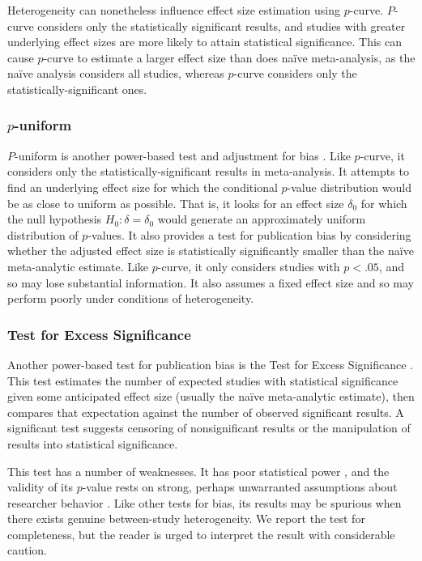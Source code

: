\documentclass[man]{apa6}
\begin{document}
Heterogeneity can nonetheless influence effect size estimation using $p$-curve. $P$-curve considers only the statistically significant results, and studies with greater underlying effect sizes are more likely to attain statistical significance. This can cause $p$-curve to estimate a larger effect size than does na{\"i}ve meta-analysis, as the na{\"i}ve analysis considers all studies, whereas $p$-curve considers only the statistically-significant ones. 

\subsubsection{$p$-uniform}
$P$-uniform is another power-based test and adjustment for bias \citep{vanAssen:etal:2015}. Like $p$-curve, it considers only the statistically-significant results in meta-analysis. It attempts to find an underlying effect size for which the conditional $p$-value distribution would be as close to uniform as possible. That is, it looks for an effect size $\delta_0$ for which the null hypothesis $H_0: \delta = \delta_0$ would generate an approximately uniform distribution of $p$-values. It also provides a test for publication bias by considering whether the adjusted effect size is statistically significantly smaller than the na{\"i}ve meta-analytic estimate. Like $p$-curve, it only considers studies with $p < .05$, and so may lose substantial information. It also assumes a fixed effect size and so may perform poorly under conditions of heterogeneity.   

\subsubsection{Test for Excess Significance}
Another power-based test for publication bias is the Test for Excess Significance \citep{Ioannidis:Trikalinos:2007}. This test estimates the number of expected studies with statistical significance given some anticipated effect size (usually the na{\"i}ve meta-analytic estimate), then compares that expectation against the number of observed significant results. A significant test suggests censoring of nonsignificant results or the manipulation of results into statistical significance.

This test has a number of weaknesses. It has poor statistical power \citep{Ioannidis:Trikalinos:2007}, and the validity of its $p$-value rests on strong, perhaps unwarranted assumptions about researcher behavior \citep{Morey:2013}. Like other tests for bias, its results may be spurious when there exists genuine between-study heterogeneity. We report the test for completeness, but the reader is urged to interpret the result with considerable caution.
\end{document}
